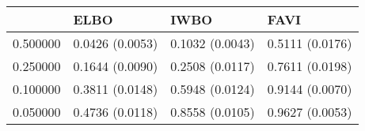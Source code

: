 \begin{tabular}{llll}
\toprule
 & ELBO & IWBO & FAVI \\
\midrule
0.500000 & 0.0426 (0.0053) & 0.1032 (0.0043) & 0.5111 (0.0176) \\
0.250000 & 0.1644 (0.0090) & 0.2508 (0.0117) & 0.7611 (0.0198) \\
0.100000 & 0.3811 (0.0148) & 0.5948 (0.0124) & 0.9144 (0.0070) \\
0.050000 & 0.4736 (0.0118) & 0.8558 (0.0105) & 0.9627 (0.0053) \\
\bottomrule
\end{tabular}
